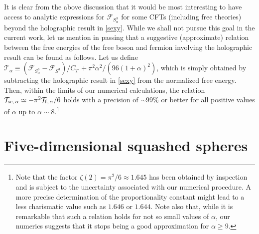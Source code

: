 \documentclass[12pt]{article}
\numberwithin{equation}{section}
\newcommand{\ssc}{\scriptscriptstyle}
\newcommand{\ctt}{C_{\ssc T}}
\begin{document}
It is clear from the above discussion that it would be most interesting to have access to analytic expressions for $\mathcal{F}_{S^3_{\alpha}}$ for some CFTs (including free theories) beyond the holographic result in \eqref{sexy}. While we shall not pursue this goal in the current work, let us mention in passing that a suggestive (approximate) relation between the free energies of the free boson and fermion involving the holographic result can be found as follows. Let us define $\mathcal{T}_{\alpha}\equiv (\mathcal{F}_{S^{3}_{\alpha}}-\mathcal{F}_{S^{3}})/\ctt\, +\pi^2\alpha^2/( 96(1+\alpha)^2)$, which is simply obtained by subtracting the holographic result in \eqref{sexy} from the normalized free energy. Then, within the limits of our numerical calculations, the relation $\mathcal{T}_{\rm sc, \,\alpha}\simeq-\pi^2\mathcal{T}_{\rm f, \,\alpha}/6$ holds
with a precision of $\sim 99\%$ or better for all positive values of $\alpha$ up to $\alpha \sim 8$.\footnote{Note that the factor $\zeta(2)=\pi^2/6\approx 1.645$ has been obtained by inspection and is subject to the uncertainty associated with our numerical procedure. A more precise determination of the proportionality constant might lead to a less charismatic value such as $1.646$ or $1.644$. Note also that, while it is remarkable that such a relation holds for not so small values of $\alpha$, our numerics suggests that it stops being a good approximation for $\alpha \geq 9$.}

\section{Five-dimensional squashed spheres}
\label{sec:5}
\end{document}
